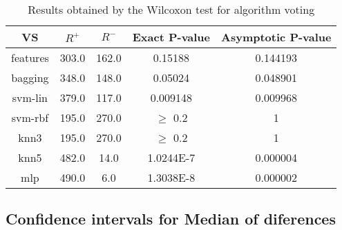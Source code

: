 \documentclass[a4paper,10pt]{article}
\begin{document}
\begin{table}[!htp]
\centering\small
\begin{tabular}{
|c|c|c|c|c|}
\hline
 VS & $R^{+}$ & $R^{-}$ & Exact P-value & Asymptotic P-value \\ \hline 
features & 303.0 & 162.0 & 0.15188 & 0.144193\\ \hline 
bagging & 348.0 & 148.0 & 0.05024 & 0.048901\\ \hline 
svm-lin & 379.0 & 117.0 & 0.009148 & 0.009968\\ \hline 
svm-rbf & 195.0 & 270.0 & $\geq$ 0.2 & 1\\ \hline 
knn3 & 195.0 & 270.0 & $\geq$ 0.2 & 1\\ \hline 
knn5 & 482.0 & 14.0 & 1.0244E-7 & 0.000004\\ \hline 
mlp & 490.0 & 6.0 & 1.3038E-8 & 0.000002\\ \hline 

\end{tabular}
\caption{Results obtained by the Wilcoxon test for algorithm voting}
\end{table}

\subsection{Confidence intervals for Median of diferences}
\end{document}
